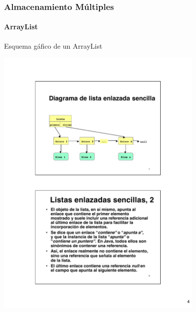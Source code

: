\documentclass{beamer}
\begin{document}
        \begin{frame}
			\frametitle{Almacenamiento M\'ultiples}
			\framesubtitle{ArrayList}

            \begin{block}{Esquema g\'afico de un ArrayList}
				\begin{center}
					\includegraphics[width=10cm]{images/esquema.pdf}
				\end{center}
			\end{block}
		\end{frame}
\end{document}
